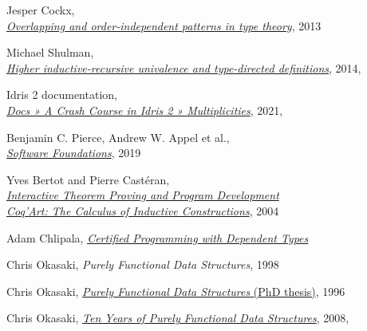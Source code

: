 \documentclass[declaration,mgr,english,shortabstract]{iithesis}
\begin{document}
\begin{thebibliography}{1}
    Jesper Cockx, \\
    \href{https://www.scriptiebank.be/sites/default/files/webform/scriptie/masterpaper_5.pdf}{\textit{Overlapping and order-independent patterns in type theory}}, 2013

    Michael Shulman, \\
    \href{https://homotopytypetheory.org/2014/06/08/hiru-tdd/}{\textit{Higher inductive-recursive univalence and type-directed definitions}}, 2014, \\

    Idris 2 documentation, \\
    \href{https://idris2.readthedocs.io/en/latest/tutorial/multiplicities.html}{\textit{Docs » A Crash Course in Idris 2 » Multiplicities}}, 2021, \\

    Benjamin C. Pierce, Andrew W. Appel et al., \\
    \href{https://softwarefoundations.cis.upenn.edu/}{\textit{Software Foundations}}, 2019

    Yves Bertot and Pierre Castéran, \\
    \href{https://www.labri.fr/perso/casteran/CoqArt/}{\textit{Interactive Theorem Proving and Program Development \\ Coq'Art: The Calculus of Inductive Constructions}}, 2004

    Adam Chlipala,
    \href{http://adam.chlipala.net/cpdt/}{\textit{Certified Programming with Dependent Types}}

    Chris Okasaki,
    \textit{Purely Functional Data Structures},
    1998

    Chris Okasaki,
    \href{https://www.cs.cmu.edu/~rwh/theses/okasaki.pdf}{\textit{Purely Functional Data Structures} (PhD thesis)},
    1996

    Chris Okasaki,
    \href{https://okasaki.blogspot.com/2008/02/ten-years-of-purely-functional-data.html}{\textit{Ten Years of Purely Functional Data Structures}}, 2008, \\


\end{thebibliography}
\end{document}
